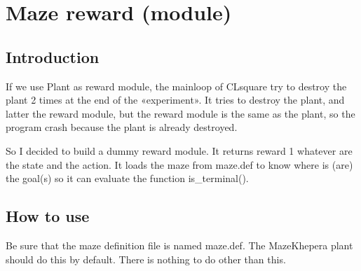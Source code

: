 \section{Maze reward (module)}

\subsection{Introduction}

If we use Plant as reward module, the mainloop of CLsquare try to destroy 
the plant 2 times at the end of the «experiment». It tries to destroy 
the plant, and latter the reward module, but the reward module is the 
same as the plant, so the program crash because the plant is already 
destroyed. 

So I decided to build a dummy reward module. It returns reward 1 
whatever are the state and the action. It loads the maze from maze.def 
to know where is (are) the goal(s) so it can evaluate the function 
is\_terminal().

\subsection{How to use}

Be sure that the maze definition file is named maze.def. The MazeKhepera
plant should do this by default. There is nothing to do other than this.

